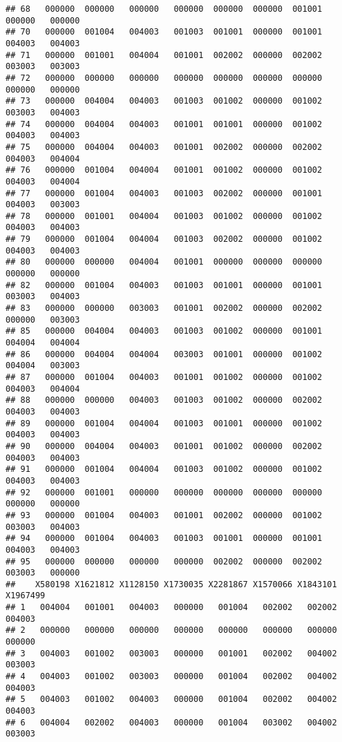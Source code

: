 \documentclass[
]{article}
\begin{document}
\begin{verbatim}
## 68   000000  000000   000000   000000  000000  000000  001001   000000   000000
## 70   000000  001004   004003   001003  001001  000000  001001   004003   004003
## 71   000000  001001   004004   001001  002002  000000  002002   003003   003003
## 72   000000  000000   000000   000000  000000  000000  000000   000000   000000
## 73   000000  004004   004003   001003  001002  000000  001002   003003   004003
## 74   000000  004004   004003   001001  001001  000000  001002   004003   004003
## 75   000000  004004   004003   001001  002002  000000  002002   004003   004004
## 76   000000  001004   004004   001001  001002  000000  001002   004003   004004
## 77   000000  001004   004003   001003  002002  000000  001001   004003   003003
## 78   000000  001001   004004   001003  001002  000000  001002   004003   004003
## 79   000000  001004   004004   001003  002002  000000  001002   004003   004003
## 80   000000  000000   004004   001001  000000  000000  000000   000000   000000
## 82   000000  001004   004003   001003  001001  000000  001001   003003   004003
## 83   000000  000000   003003   001001  002002  000000  002002   000000   003003
## 85   000000  004004   004003   001003  001002  000000  001001   004004   004004
## 86   000000  004004   004004   003003  001001  000000  001002   004004   003003
## 87   000000  001004   004003   001001  001002  000000  001002   004003   004004
## 88   000000  000000   004003   001003  001002  000000  002002   004003   004003
## 89   000000  001004   004004   001003  001001  000000  001002   004003   004003
## 90   000000  004004   004003   001001  001002  000000  002002   004003   004003
## 91   000000  001004   004004   001003  001002  000000  001002   004003   004003
## 92   000000  001001   000000   000000  000000  000000  000000   000000   000000
## 93   000000  001004   004003   001001  002002  000000  001002   003003   004003
## 94   000000  001004   004003   001003  001001  000000  001001   004003   004003
## 95   000000  000000   000000   000000  002002  000000  002002   003003   000000
##    X580198 X1621812 X1128150 X1730035 X2281867 X1570066 X1843101 X1967499
## 1   004004   001001   004003   000000   001004   002002   002002   004003
## 2   000000   000000   000000   000000   000000   000000   000000   000000
## 3   004003   001002   003003   000000   001001   002002   004002   003003
## 4   004003   001002   003003   000000   001004   002002   004002   004003
## 5   004003   001002   004003   000000   001004   002002   004002   004003
## 6   004004   002002   004003   000000   001004   003002   004002   003003

\end{verbatim}
\end{document}

